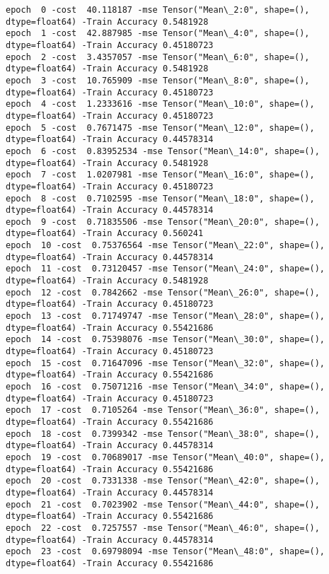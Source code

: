 \documentclass[11pt]{article}
\begin{document}
    \begin{Verbatim}[commandchars=\\\{\}]
epoch  0 -cost  40.118187 -mse Tensor("Mean\_2:0", shape=(), dtype=float64) -Train Accuracy 0.5481928
epoch  1 -cost  42.887985 -mse Tensor("Mean\_4:0", shape=(), dtype=float64) -Train Accuracy 0.45180723
epoch  2 -cost  3.4357057 -mse Tensor("Mean\_6:0", shape=(), dtype=float64) -Train Accuracy 0.5481928
epoch  3 -cost  10.765909 -mse Tensor("Mean\_8:0", shape=(), dtype=float64) -Train Accuracy 0.45180723
epoch  4 -cost  1.2333616 -mse Tensor("Mean\_10:0", shape=(), dtype=float64) -Train Accuracy 0.45180723
epoch  5 -cost  0.7671475 -mse Tensor("Mean\_12:0", shape=(), dtype=float64) -Train Accuracy 0.44578314
epoch  6 -cost  0.83952534 -mse Tensor("Mean\_14:0", shape=(), dtype=float64) -Train Accuracy 0.5481928
epoch  7 -cost  1.0207981 -mse Tensor("Mean\_16:0", shape=(), dtype=float64) -Train Accuracy 0.45180723
epoch  8 -cost  0.7102595 -mse Tensor("Mean\_18:0", shape=(), dtype=float64) -Train Accuracy 0.44578314
epoch  9 -cost  0.71835506 -mse Tensor("Mean\_20:0", shape=(), dtype=float64) -Train Accuracy 0.560241
epoch  10 -cost  0.75376564 -mse Tensor("Mean\_22:0", shape=(), dtype=float64) -Train Accuracy 0.44578314
epoch  11 -cost  0.73120457 -mse Tensor("Mean\_24:0", shape=(), dtype=float64) -Train Accuracy 0.5481928
epoch  12 -cost  0.7842662 -mse Tensor("Mean\_26:0", shape=(), dtype=float64) -Train Accuracy 0.45180723
epoch  13 -cost  0.71749747 -mse Tensor("Mean\_28:0", shape=(), dtype=float64) -Train Accuracy 0.55421686
epoch  14 -cost  0.75398076 -mse Tensor("Mean\_30:0", shape=(), dtype=float64) -Train Accuracy 0.45180723
epoch  15 -cost  0.71647096 -mse Tensor("Mean\_32:0", shape=(), dtype=float64) -Train Accuracy 0.55421686
epoch  16 -cost  0.75071216 -mse Tensor("Mean\_34:0", shape=(), dtype=float64) -Train Accuracy 0.45180723
epoch  17 -cost  0.7105264 -mse Tensor("Mean\_36:0", shape=(), dtype=float64) -Train Accuracy 0.55421686
epoch  18 -cost  0.7399342 -mse Tensor("Mean\_38:0", shape=(), dtype=float64) -Train Accuracy 0.44578314
epoch  19 -cost  0.70689017 -mse Tensor("Mean\_40:0", shape=(), dtype=float64) -Train Accuracy 0.55421686
epoch  20 -cost  0.7331338 -mse Tensor("Mean\_42:0", shape=(), dtype=float64) -Train Accuracy 0.44578314
epoch  21 -cost  0.7023902 -mse Tensor("Mean\_44:0", shape=(), dtype=float64) -Train Accuracy 0.55421686
epoch  22 -cost  0.7257557 -mse Tensor("Mean\_46:0", shape=(), dtype=float64) -Train Accuracy 0.44578314
epoch  23 -cost  0.69798094 -mse Tensor("Mean\_48:0", shape=(), dtype=float64) -Train Accuracy 0.55421686

\end{Verbatim}
\end{document}
